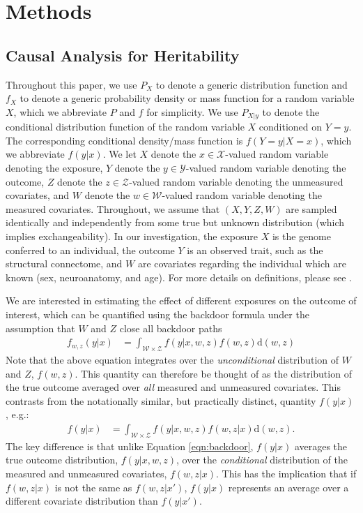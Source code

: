\section{Methods}\label{sec:methods}
\subsection{Causal Analysis for Heritability} %
Throughout this paper, we use $P_X$ to denote a generic distribution function and $f_X$ to denote a generic probability density or mass function for a random variable $X$, which we abbreviate $P$ and $f$ for simplicity. We use $P_{X|y}$ to denote the conditional distribution function of the random variable $X$ conditioned on $Y=y$. The corresponding conditional density/mass function is $f(Y=y|X=x)$, which we abbreviate $f(y|x)$. We let $X$ denote the $x\in\mathcal{X}$-valued random variable denoting the exposure, $Y$ denote the $y\in\mathcal{Y}$-valued random variable denoting the outcome, $Z$ denote the $z\in\mathcal{Z}$-valued random variable denoting the unmeasured covariates, and $W$ denote the $w\in\mathcal{W}$-valued random variable denoting the measured covariates. 
Throughout, we assume that $(X, Y, Z, W)$ are sampled identically and independently from some true but unknown distribution (which implies exchangeability). In our investigation, the exposure $X$ is the genome conferred to an individual, the outcome $Y$ is an observed trait, such as the structural connectome, and $W$ are covariates regarding the individual which are known (sex, neuroanatomy, and age). For more details on definitions, please see \cite{bridgeford2023learning}.

We are interested in estimating the effect of different exposures on the outcome of interest, which can be quantified using the backdoor formula under the assumption that $W$ and $Z$ close all backdoor paths
\begin{align}
    f_{w, z}(y|x) &= \int_{\mathcal{W}\times\mathcal{Z}}
    f(y|x, w, z)f(w, z)\mathrm{d}(w, z) \label{eqn:backdoor}
\end{align}
Note that the above equation integrates over the \textit{unconditional} distribution of $W$ and $Z$, $f(w, z)$. This quantity can therefore be thought of as the distribution of the true outcome averaged over \textit{all} measured and unmeasured covariates. This contrasts from the notationally similar, but practically distinct, quantity $f(y|x)$, e.g.:
\begin{align*}
    f(y | x) &= \int_{\mathcal W \times \mathcal Z}{f(y | x, w, z) f(w, z | x)}\mathrm{d}{(w, z)}.     
\end{align*}
The key difference is that unlike Equation \eqref{eqn:backdoor}, $f(y | x)$ averages the true outcome distribution, $f(y | x, w, z)$, over the \textit{conditional} distribution of the measured and unmeasured covariates, $f(w, z | x)$. This has the implication that if $f(w, z|x)$ is not the same as $f(w,z|x')$, $f(y|x)$ represents an average over a different covariate distribution than $f(y|x')$.

